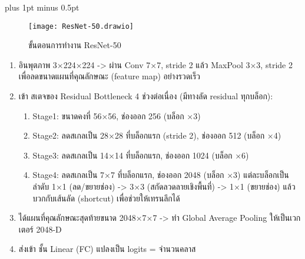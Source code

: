 
\clearpage
\thispagestyle{plain}

\begingroup
\fontsize{16pt}{19.2pt}\selectfont
\justifying
\XeTeXlinebreakskip=0pt plus 1pt minus 0.5pt
\setlength{\parindent}{1.5cm}
\setlength{\parskip}{0pt}


\begin{figure}[h]
	\centering
	\texttt{[image: ResNet-50.drawio]}
	\caption{ขั้นตอนการทำงาน ResNet-50}
\end{figure}

\begin{sloppypar}
	\begin{enumerate} %
		\item อินพุตภาพ 3×224×224 -> ผ่าน Conv 7×7, stride 2 แล้ว MaxPool 3×3, stride 2 เพื่อลดขนาดแผนที่คุณลักษณะ (feature map) อย่างรวดเร็ว
		\item เข้า สเตจของ Residual Bottleneck 4 ช่วงต่อเนื่อง (มีทางลัด residual ทุกบล็อก):
		\begin{enumerate}
			\item Stage1: ขนาดคงที่ 56×56, ช่องออก 256 (บล็อก ×3)
			\item Stage2: ลดสเกลเป็น 28×28 ที่บล็อกแรก (stride 2), ช่องออก 512 (บล็อก ×4)
			\item Stage3: ลดสเกลเป็น 14×14 ที่บล็อกแรก, ช่องออก 1024 (บล็อก ×6)
			\item Stage4: ลดสเกลเป็น 7×7 ที่บล็อกแรก, ช่องออก 2048 (บล็อก ×3)
			แต่ละบล็อกเป็นลำดับ 1×1 (ลด/ขยายช่อง) -> 3×3 (สกัดลวดลายเชิงพื้นที่) -> 1×1 (ขยายช่อง) แล้วบวกกับเส้นลัด (shortcut) เพื่อช่วยให้เทรนลึกได้
		\end{enumerate}
		\item ได้แผนที่คุณลักษณะสุดท้ายขนาด 2048×7×7 -> ทำ Global Average Pooling ให้เป็นเวกเตอร์ 2048-D
		\item ส่งเข้า ชั้น Linear (FC) แปลงเป็น logits = จำนวนคลาส
	\end{enumerate}
\end{sloppypar}